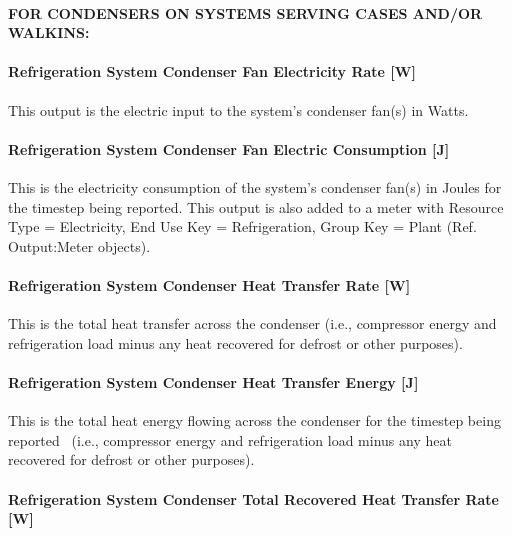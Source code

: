 \paragraph{FOR CONDENSERS ON SYSTEMS SERVING CASES AND/OR WALKINS:}\label{for-condensers-on-systems-serving-cases-andor-walkins}

\paragraph{Refrigeration System Condenser Fan Electricity Rate {[}W{]}}\label{refrigeration-system-condenser-fan-electric-power-w}

This output is the electric input to the system's condenser fan(s) in Watts.

\paragraph{Refrigeration System Condenser Fan Electric Consumption {[}J{]}}\label{refrigeration-system-condenser-fan-electric-consumption-j}

This is the electricity consumption of the system's condenser fan(s) in Joules for the timestep being reported. This output is also added to a meter with Resource Type = Electricity, End Use Key = Refrigeration, Group Key = Plant (Ref. Output:Meter objects).

\paragraph{Refrigeration System Condenser Heat Transfer Rate {[}W{]}}\label{refrigeration-system-condenser-heat-transfer-rate-w}

This is the total heat transfer across the condenser (i.e., compressor energy and refrigeration load minus any heat recovered for defrost or other purposes).

\paragraph{Refrigeration System Condenser Heat Transfer Energy {[}J{]}}\label{refrigeration-system-condenser-heat-transfer-energy-j}

This is the total heat energy flowing across the condenser for the timestep being reported~ (i.e., compressor energy and refrigeration load minus any heat recovered for defrost or other purposes).

\paragraph{Refrigeration System Condenser Total Recovered Heat Transfer Rate {[}W{]}}\label{refrigeration-system-condenser-total-recovered-heat-transfer-rate-w}

